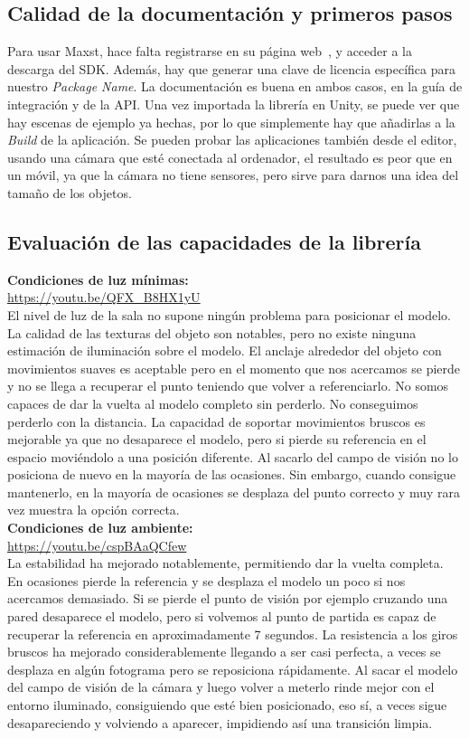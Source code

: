 \subsection{Calidad de la documentación y primeros pasos}
Para usar Maxst, hace falta registrarse en su página web~\cite{Maxst}, y acceder a la descarga del SDK. Además, hay que generar una clave de licencia específica para nuestro \textit{Package Name}. La documentación  es buena en ambos casos, en la guía de integración y de la API. Una vez importada la librería en Unity, se puede ver que hay escenas de ejemplo ya hechas, por lo que simplemente hay que añadirlas a la \textit{Build} de la aplicación. Se pueden probar las aplicaciones también desde el editor, usando una cámara que esté conectada al ordenador, el resultado es peor que en un móvil, ya que la cámara no tiene sensores, pero sirve para darnos una idea del tamaño de los objetos. 
\subsection{Evaluación de las capacidades de la librería}
\textbf{Condiciones de luz mínimas:}\\
\url{https://youtu.be/QFX_B8HX1yU}\\

El nivel de luz de la sala no supone ningún problema para posicionar el modelo. La calidad de las texturas del objeto son notables, pero no existe ninguna estimación de iluminación sobre el modelo. El anclaje alrededor del objeto con movimientos suaves es aceptable pero en el momento que nos acercamos se pierde y no se llega a recuperar el punto teniendo que volver a referenciarlo.  No somos capaces de dar la vuelta al modelo completo sin perderlo. No conseguimos perderlo con la distancia. La capacidad de soportar movimientos bruscos es mejorable ya que no desaparece el modelo, pero si pierde su referencia en el espacio moviéndolo a una posición diferente. Al sacarlo del campo de visión no lo posiciona de nuevo en la mayoría de las ocasiones. Sin embargo, cuando consigue mantenerlo, en la mayoría de ocasiones se desplaza del punto correcto y muy rara vez muestra la opción correcta.\\

\textbf{Condiciones de luz ambiente:}\\
\url{https://youtu.be/cspBAaQCfew}\\

La estabilidad ha mejorado notablemente, permitiendo dar la vuelta completa. En ocasiones pierde la referencia y se desplaza el modelo un poco si nos acercamos demasiado. Si se pierde el punto de visión por ejemplo cruzando una pared desaparece el modelo, pero si volvemos al punto de partida es capaz de recuperar la referencia en aproximadamente 7 segundos. La resistencia a los giros bruscos ha mejorado considerablemente llegando a ser casi perfecta, a veces se desplaza en algún fotograma pero se reposiciona rápidamente. Al sacar el modelo del campo de visión de la cámara y luego volver a meterlo rinde mejor con el entorno iluminado, consiguiendo que esté bien posicionado, eso sí, a veces sigue desapareciendo y volviendo a aparecer, impidiendo así una transición limpia.

